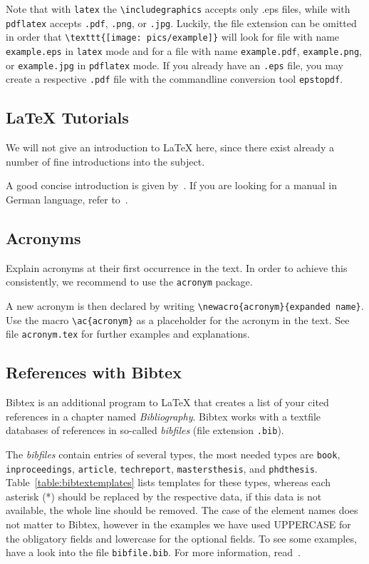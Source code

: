 \documentclass[10pt,a4paper,twoside,twocolumn]{article}
\begin{document}
Note that with \texttt{latex} the \verb+\includegraphics+ accepts
only .eps files, while with \texttt{pdflatex} accepts \texttt{.pdf},
\texttt{.png}, or \texttt{.jpg}. Luckily, the file extension can be
omitted in order that \verb+\texttt{[image: pics/example]}+ will
look for file with name \texttt{example.eps} in \texttt{latex} mode
and for a file with name \texttt{example.pdf}, \texttt{example.png},
or \texttt{example.jpg} in \texttt{pdflatex} mode. If you already
have an \texttt{.eps} file, you may create a respective
\texttt{.pdf} file with the commandline conversion tool
\texttt{epstopdf}.

\subsection{{\LaTeX} Tutorials}

We will not give an introduction to {\LaTeX} here, since there exist
already a number of fine introductions into the subject.

A good concise introduction is given by~\cite{oetiker:lshort}. If
you are looking for a manual in German language, refer
to~\cite{juergens:latexeinf,juergens:latexfortg}.


\subsection{Acronyms}

Explain acronyms at their first occurrence in the text. In order to
achieve this consistently, we recommend to use the \texttt{acronym}
package.

A new acronym is then declared by writing
\verb+\newacro{acronym}{expanded name}+. Use the macro
\verb+\ac{acronym}+ as a placeholder for the acronym in the text.
See file \texttt{acronym.tex} for further examples and explanations.


\subsection{References with Bibtex}

Bibtex is an additional program to {\LaTeX} that creates a list of
your cited references in a chapter named {\em Bibliography}. Bibtex
works with a textfile databases of references in so-called
\emph{bibfiles} (file extension \texttt{.bib}).

The \emph{bibfiles} contain entries of several types, the most
needed types are \texttt{book}, \texttt{inproceedings},
\texttt{article}, \texttt{techreport}, \texttt{mastersthesis}, and
\texttt{phdthesis}. Table~\ref{table:bibtextemplates} lists templates
for these types, whereas each asterisk (*) should be replaced by the
respective data, if this data is not available, the whole line
should be removed. The case of the element names does not matter to
Bibtex, however in the examples we have used UPPERCASE for the
obligatory fields and lowercase for the optional fields. To see some
examples, have a look into the file \texttt{bibfile.bib}. For more
information, read~\cite{patashnik:1988}.
\end{document}

